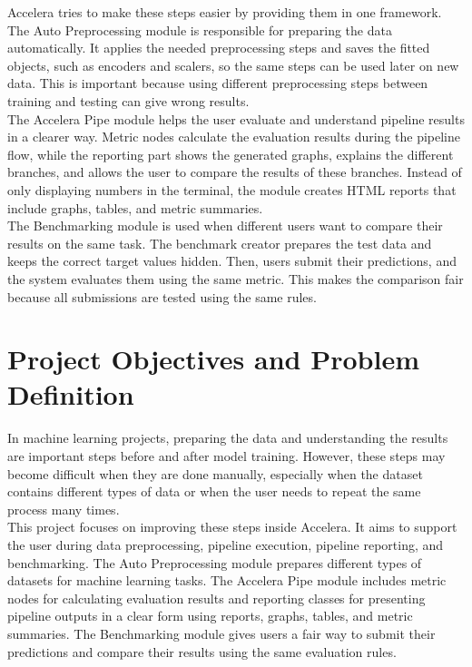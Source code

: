 \documentclass[12pt,a4paper,oneside]{report}
\begin{document}
\noindent Accelera tries to make these steps easier by providing them in one framework. The Auto Preprocessing module is responsible for preparing the data automatically. It applies the needed preprocessing steps and saves the fitted objects, such as encoders and scalers, so the same steps can be used later on new data. This is important because using different preprocessing steps between training and testing can give wrong results.\\

\noindent The Accelera Pipe module helps the user evaluate and understand pipeline results in a clearer way. Metric nodes calculate the evaluation results during the pipeline flow, while the reporting part shows the generated graphs, explains the different branches, and allows the user to compare the results of these branches. Instead of only displaying numbers in the terminal, the module creates HTML reports that include graphs, tables, and metric summaries.\\

\noindent The Benchmarking module is used when different users want to compare their results on the same task. The benchmark creator prepares the test data and keeps the correct target values hidden. Then, users submit their predictions, and the system evaluates them using the same metric. This makes the comparison fair because all submissions are tested using the same rules.\\



\section{Project Objectives and Problem Definition}

In machine learning projects, preparing the data and understanding the results are important steps before and after model training. However, these steps may become difficult when they are done manually, especially when the dataset contains different types of data or when the user needs to repeat the same process many times.\\

\noindent This project focuses on improving these steps inside Accelera. It aims to support the user during data preprocessing, pipeline execution, pipeline reporting, and benchmarking. The Auto Preprocessing module prepares different types of datasets for machine learning tasks. The Accelera Pipe module includes metric nodes for calculating evaluation results and reporting classes for presenting pipeline outputs in a clear form using reports, graphs, tables, and metric summaries. The Benchmarking module gives users a fair way to submit their predictions and compare their results using the same evaluation rules.\\
\end{document}
